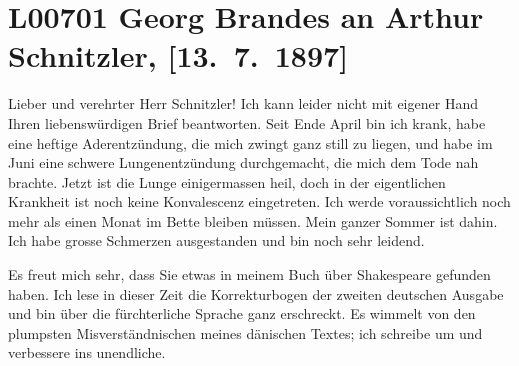 

\section[Georg Brandes an Arthur Schnitzler, {[}13. 7. 1897{]}]{L00701 Georg Brandes an Arthur Schnitzler, {[}13. 7. 1897{]}}
\nopagebreak{}
\rehead{ }\normalsize\beginnumbering{}
\toendnotes[C]{\smallbreak\pagebreak[2]}
\toendnotes[C]{\smallbreak}
\pstart{}{\pb}Lieber und verehrter Herr
                  Schnitzler!\pend\vspace{0.5em}
\pstart
           Ich kann leider nicht mit eigener Hand Ihren liebenswürdigen Brief beantworten. Seit
                  Ende April bin ich krank, habe eine heftige Aderentzündung, die mich
               zwingt ganz still zu liegen, und habe im Juni eine schwere
               Lungenentzündung durchgemacht, die mich dem Tode nah brachte. Jetzt ist die Lunge
               einigermassen heil, doch in der eigentlichen Krankheit ist noch keine Konvalescenz
               eingetreten. Ich werde voraussichtlich noch mehr als einen Monat im Bette bleiben
               müssen. Mein ganzer Sommer ist dahin. Ich habe grosse Schmerzen ausgestanden und bin
               noch sehr leidend.\pend
           
\pstart
           Es freut mich sehr, dass Sie etwas in {\pb}meinem Buch über Shakespeare gefunden haben. Ich lese in dieser Zeit die Korrekturbogen der
               zweiten deutschen Ausgabe und bin über die fürchterliche Sprache ganz erschreckt. Es
               wimmelt von den plumpsten Misverständnischen meines dänischen Textes; ich schreibe um und verbessere ins unendliche.\pend
           
